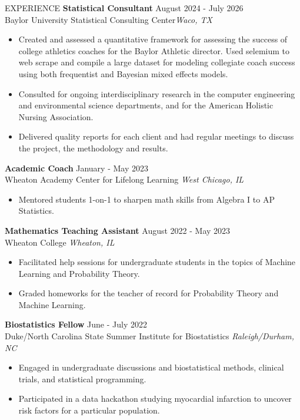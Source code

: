 \documentclass{resume} %
\begin{document}
\begin{rSection}{EXPERIENCE}
\textbf{Statistical Consultant} \hfill August 2024 - July 2026\\
Baylor University Statistical Consulting Center\hfill \textit{Waco, TX}
 \begin{itemize}
    \itemsep -3pt {}
     \item Created and assessed a quantitative framework for assessing the success of college athletics coaches for the Baylor Athletic director. Used selemium to web scrape and compile a large dataset for modeling collegiate coach success using both frequentist and Bayesian mixed effects models.
     \item Consulted for ongoing interdisciplinary research in the computer engineering and environmental science departments, and for the American Holistic Nursing Association.
     \item Delivered quality reports for each client and had regular meetings to discuss the project, the methodology and results.
 \end{itemize}

\textbf{Academic Coach} \hfill January - May 2023\\
Wheaton Academy Center for Lifelong Learning \hfill \textit{West Chicago, IL}
 \begin{itemize}
    \itemsep -3pt {}
     \item Mentored students 1-on-1 to sharpen math skills from Algebra I to AP Statistics.
 \end{itemize}

\textbf{Mathematics Teaching Assistant} \hfill August 2022 - May 2023\\
Wheaton College \hfill \textit{Wheaton, IL}
 \begin{itemize}
    \itemsep -3pt {}
     \item Facilitated help sessions for undergraduate students in the topics of Machine Learning and Probability Theory.
     \item Graded homeworks for the teacher of record for Probability Theory and Machine Learning.
 \end{itemize}

 \textbf{Biostatistics Fellow} \hfill June - July 2022\\
 Duke/North Carolina State Summer Institute for Biostatistics \hfill \textit{Raleigh/Durham, NC}
 \begin{itemize}
    \itemsep -3pt {}
     \item Engaged in undergraduate discussions and biostatistical methods, clinical trials, and statistical programming.
     \item Participated in a data hackathon studying myocardial infarction to uncover risk factors for a particular population.
 \end{itemize}

\end{rSection}
\end{document}
